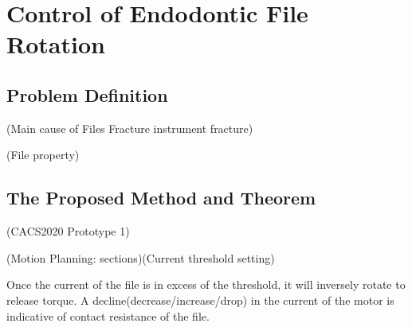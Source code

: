\chapter{Control of Endodontic File Rotation}
\section{Problem Definition}
(Main cause of Files Fracture instrument fracture)					
\par\noindent
(File property)
\section{The Proposed Method and Theorem}
(CACS2020 Prototype 1)							
\par\noindent
(Motion Planning: sections)(Current threshold setting)
\par\noindent
Once the current of the file is in excess of the threshold, it will inversely rotate to release torque. A decline(decrease/increase/drop) in the current of the motor is indicative of contact resistance of the file.